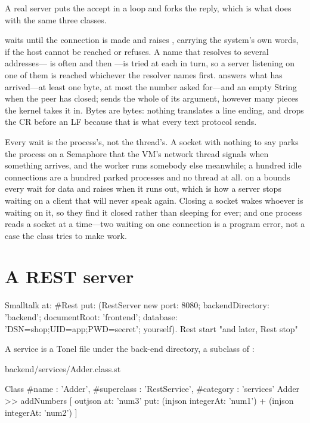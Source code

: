 A real server puts the accept in a loop and forks the reply, which is what
 does with the same three classes.

 waits until the connection is made and raises
, carrying the system's own words, if the host cannot be reached
or refuses. A name that resolves to several addresses--- is
often  and then ---is tried at each in turn, so a
server listening on one of them is reached whichever the resolver names
first.  answers what has arrived---at least one byte,
at most the number asked for---and an empty String when the peer has closed;
 sends the whole of its argument, however many pieces the kernel
takes it in. Bytes are bytes: nothing translates a line ending, and
 drops the CR before an LF because that is what every text
protocol sends.

Every wait is the process's, not the thread's. A socket with nothing to say
parks the process on a Semaphore that the VM's network thread signals when
something arrives, and the worker runs somebody else meanwhile; a hundred
idle connections are a hundred parked processes and no thread at all.
 on a  bounds every wait for data and
raises  when it runs out, which is how a server stops waiting on
a client that will never speak again. Closing a socket wakes whoever is
waiting on it, so they find it closed rather than sleeping for ever; and one
process reads a socket at a time---two waiting on one connection is a
program error, not a case the class tries to make work.

\section{A REST server}
\label{sec:rest}

\begin{st}
Smalltalk at: #Rest put: (RestServer new
    port: 8080;
    backendDirectory: 'backend';
    documentRoot: 'frontend';
    database: 'DSN=shop;UID=app;PWD=secret';
    yourself).
Rest start                                     "and later, Rest stop"
\end{st}

A service is a Tonel file under the back-end directory, a subclass of
:

\begin{plain}
backend/services/Adder.class.st

Class { #name : 'Adder', #superclass : 'RestService', #category : 'services' }
Adder >> addNumbers [
    outjson at: 'num3' put: (injson integerAt: 'num1') + (injson integerAt: 'num2')
]
\end{plain}

